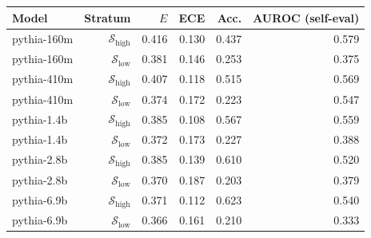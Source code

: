 \begin{tabular}{lrrrrr}
\toprule
Model & Stratum & $E$ & ECE & Acc. & AUROC (self-eval) \\
\midrule
pythia-160m & $\mathcal{S}_{\mathrm{high}}$ & 0.416 & 0.130 & 0.437 & 0.579 \\
pythia-160m & $\mathcal{S}_{\mathrm{low}}$ & 0.381 & 0.146 & 0.253 & 0.375 \\
pythia-410m & $\mathcal{S}_{\mathrm{high}}$ & 0.407 & 0.118 & 0.515 & 0.569 \\
pythia-410m & $\mathcal{S}_{\mathrm{low}}$ & 0.374 & 0.172 & 0.223 & 0.547 \\
pythia-1.4b & $\mathcal{S}_{\mathrm{high}}$ & 0.385 & 0.108 & 0.567 & 0.559 \\
pythia-1.4b & $\mathcal{S}_{\mathrm{low}}$ & 0.372 & 0.173 & 0.227 & 0.388 \\
pythia-2.8b & $\mathcal{S}_{\mathrm{high}}$ & 0.385 & 0.139 & 0.610 & 0.520 \\
pythia-2.8b & $\mathcal{S}_{\mathrm{low}}$ & 0.370 & 0.187 & 0.203 & 0.379 \\
pythia-6.9b & $\mathcal{S}_{\mathrm{high}}$ & 0.371 & 0.112 & 0.623 & 0.540 \\
pythia-6.9b & $\mathcal{S}_{\mathrm{low}}$ & 0.366 & 0.161 & 0.210 & 0.333 \\
\bottomrule
\end{tabular}
